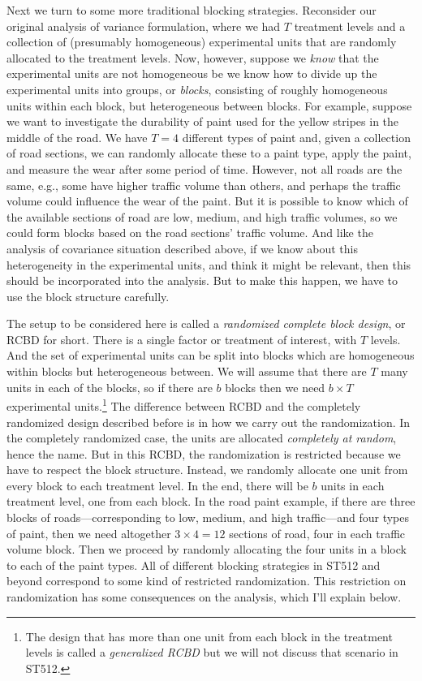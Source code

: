 \documentclass[a4paper, 12pt]{article}
\theoremstyle{plain}
\theoremstyle{definition}
\theoremstyle{remark}
\begin{document}
Next we turn to some more traditional blocking strategies.  Reconsider our original analysis of variance formulation, where we had $T$ treatment levels and a collection of (presumably homogeneous) experimental units that are randomly allocated to the treatment levels.  Now, however, suppose we {\em know} that the experimental units are not homogeneous be we know how to divide up the experimental units into groups, or {\em blocks}, consisting of roughly homogeneous units within each block, but heterogeneous between blocks.  For example, suppose we want to investigate the durability of paint used for the yellow stripes in the middle of the road.  We have $T=4$ different types of paint and, given a collection of road sections, we can randomly allocate these to a paint type, apply the paint, and measure the wear after some period of time.  However, not all roads are the same, e.g., some have higher traffic volume than others, and perhaps the traffic volume could influence the wear of the paint.  But it is possible to know which of the available sections of road are low, medium, and high traffic volumes, so we could form blocks based on the road sections' traffic volume.  And like the analysis of covariance situation described above, if we know about this heterogeneity in the experimental units, and think it might be relevant, then this should be incorporated into the analysis.  But to make this happen, we have to use the block structure carefully.  

The setup to be considered here is called a {\em randomized complete block design}, or RCBD for short.  There is a single factor or treatment of interest, with $T$ levels.  And the set of experimental units can be split into blocks which are homogeneous within blocks but heterogeneous between.  We will assume that there are $T$ many units in each of the blocks, so if there are $b$ blocks then we need $b \times T$ experimental units.\footnote{The design that has more than one unit from each block in the treatment levels is called a {\em generalized RCBD} but we will not discuss that scenario in ST512.}  The difference between RCBD and the completely randomized design described before is in how we carry out the randomization.  In the completely randomized case, the units are allocated {\em completely at random}, hence the name.  But in this RCBD, the randomization is restricted because we have to respect the block structure.  Instead, we randomly allocate one unit from every block to each treatment level.  In the end, there will be $b$ units in each treatment level, one from each block.  In the road paint example, if there are three blocks of roads---corresponding to low, medium, and high traffic---and four types of paint, then we need altogether $3 \times 4 = 12$ sections of road, four in each traffic volume block.  Then we proceed by randomly allocating the four units in a block to each of the paint types.  All of different blocking strategies in ST512 and beyond correspond to some kind of restricted randomization.  This restriction on randomization has some consequences on the analysis, which I'll explain below.  
\end{document}
